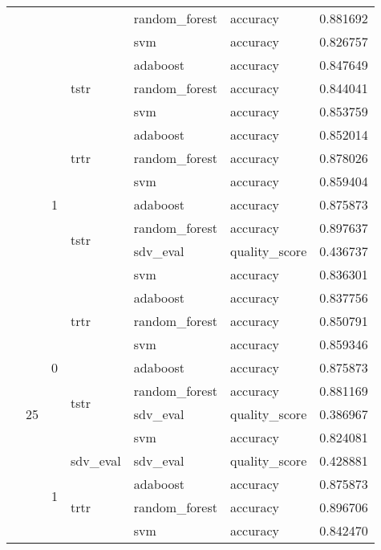 \begin{longtable}{llllllr}
\cline{5-7}
 &  &  &  & random_forest & accuracy & 0.881692 \\
\cline{5-7}
 &  &  &  & svm & accuracy & 0.826757 \\
\cline{4-7} \cline{5-7}
 &  &  & \multirow[t]{3}{*}{tstr} & adaboost & accuracy & 0.847649 \\
\cline{5-7}
 &  &  &  & random_forest & accuracy & 0.844041 \\
\cline{5-7}
 &  &  &  & svm & accuracy & 0.853759 \\
\cline{3-7} \cline{4-7} \cline{5-7}
 &  & \multirow[t]{7}{*}{1} & \multirow[t]{3}{*}{trtr} & adaboost & accuracy & 0.852014 \\
\cline{5-7}
 &  &  &  & random_forest & accuracy & 0.878026 \\
\cline{5-7}
 &  &  &  & svm & accuracy & 0.859404 \\
\cline{4-7} \cline{5-7}
 &  &  & \multirow[t]{4}{*}{tstr} & adaboost & accuracy & 0.875873 \\
\cline{5-7}
 &  &  &  & random_forest & accuracy & 0.897637 \\
\cline{5-7}
 &  &  &  & sdv_eval & quality_score & 0.436737 \\
\cline{5-7}
 &  &  &  & svm & accuracy & 0.836301 \\
\cline{2-7} \cline{3-7} \cline{4-7} \cline{5-7}
 & \multirow[t]{14}{*}{25} & \multirow[t]{7}{*}{0} & \multirow[t]{3}{*}{trtr} & adaboost & accuracy & 0.837756 \\
\cline{5-7}
 &  &  &  & random_forest & accuracy & 0.850791 \\
\cline{5-7}
 &  &  &  & svm & accuracy & 0.859346 \\
\cline{4-7} \cline{5-7}
 &  &  & \multirow[t]{4}{*}{tstr} & adaboost & accuracy & 0.875873 \\
\cline{5-7}
 &  &  &  & random_forest & accuracy & 0.881169 \\
\cline{5-7}
 &  &  &  & sdv_eval & quality_score & 0.386967 \\
\cline{5-7}
 &  &  &  & svm & accuracy & 0.824081 \\
\cline{3-7} \cline{4-7} \cline{5-7}
 &  & \multirow[t]{7}{*}{1} & sdv_eval & sdv_eval & quality_score & 0.428881 \\
\cline{4-7} \cline{5-7}
 &  &  & \multirow[t]{3}{*}{trtr} & adaboost & accuracy & 0.875873 \\
\cline{5-7}
 &  &  &  & random_forest & accuracy & 0.896706 \\
\cline{5-7}
 &  &  &  & svm & accuracy & 0.842470 \\

\end{longtable}
